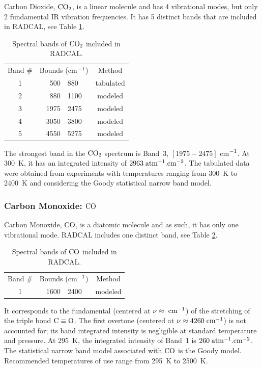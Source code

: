   Carbon Dioxide, $\rm CO_2$, is a linear molecule and has 4 vibrational modes,
  but only 2 fundamental IR vibration frequencies.
  It has 5 distinct bands that are included in RADCAL, see Table \ref{Table::CO2}.
  \begin{table}[h p] 
    \centering 
    \caption{Spectral bands of $\rm CO_2$ included in RADCAL.}
    \vspace{0.1in}
    \label{Table::CO2}
    \begin{tabular}{|c|r@{-}l|c|} 
      \hline
      Band \# & \multicolumn{2}{|l|}{Bounds (cm$\rm ^{-1}$) } & Method \\
      \cline{1-4}  
      1 &  500 & 880  & tabulated \\
      2 &  880 & 1100 & modeled \\
      3 & 1975 & 2475 & modeled \\
      4 & 3050 & 3800 & modeled \\
      5 & 4550 & 5275 & modeled \\
      \hline
    \end{tabular} 
  \end{table}
 The strongest band in the $\rm CO_2$ spectrum is Band~3, $\left[1975-2475\right]$ cm$\rm ^{-1}$.
 At 300~K, it has an integrated intensity of $2963\;\rm {atm^{-1}.cm^{-2}}$.
 The tabulated data were obtained from experiments with
 temperatures ranging from 300~K to 2400~K 
 and considering the Goody statistical narrow band model.

\subsubsection{Carbon Monoxide: $\rm CO$}
  Carbon Monoxide, $\rm CO$, is a diatomic molecule and as such, it 
  has only one vibrational mode. RADCAL includes one distinct
  band, see Table \ref{Table::CO}.
  \begin{table}[h p] 
    \centering 
    \caption{Spectral bands of $\rm CO$ included in RADCAL.}
    \vspace{0.1in}
    \label{Table::CO}
    \begin{tabular}{|c|r@{-}l|c|} 
      \hline
      Band \# & \multicolumn{2}{|l|}{Bounds (cm$\rm ^{-1}$) } & Method \\
      \cline{1-4}  
      1 & 1600 & 2400 & modeled \\
      \hline
    \end{tabular} 
  \end{table}
  It corresponds to the fundamental (centered at $ \nu \approx\;\rm {cm^{-1}}$) of
  the stretching of the triple bond $\rm C \equiv O$. The first overtone (centered at $ \nu
  \approx 4260\;\rm {cm^{-1}}$) is not accounted for; its band
  integrated intensity is negligible at standard temperature and pressure.
  At 295~K, the integrated intensity of Band~1 is $260\;\rm {atm^{-1}.cm^{-2}}$.
  The statistical narrow band model associated with $\rm CO$ is the Goody model.
  Recommended temperatures of use range from 295~K to 2500~K.

